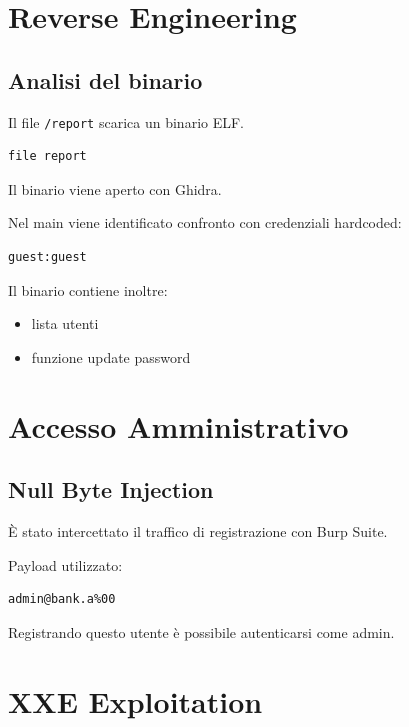 \documentclass[a4paper,11pt]{article}
\begin{document}
\section{Reverse Engineering}

\subsection{Analisi del binario}

Il file \texttt{/report} scarica un binario ELF.

\begin{lstlisting}
file report
\end{lstlisting}

Il binario viene aperto con Ghidra.

Nel main viene identificato confronto con credenziali hardcoded:

\begin{lstlisting}
guest:guest
\end{lstlisting}

Il binario contiene inoltre:
\begin{itemize}
    \item lista utenti
    \item funzione update password
\end{itemize}

\section{Accesso Amministrativo}

\subsection{Null Byte Injection}

È stato intercettato il traffico di registrazione con Burp Suite.

Payload utilizzato:

\begin{lstlisting}
admin@bank.a%00
\end{lstlisting}

Registrando questo utente è possibile autenticarsi come admin.

\section{XXE Exploitation}
\end{document}
